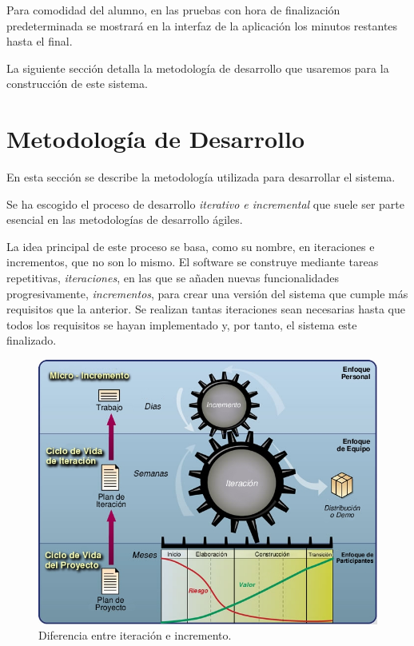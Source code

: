 Para comodidad del alumno, en las pruebas con hora de finalización predeterminada se mostrará en la interfaz de la aplicación los minutos restantes hasta el final.
\newline


La siguiente sección detalla la metodología de desarrollo que usaremos para la construcción de este sistema.

\section{Metodología de Desarrollo}
\label{sec:planificacion:metodologia}

En esta sección se describe la metodología utilizada para desarrollar el sistema.
\newline

Se ha escogido el proceso de desarrollo \emph{iterativo e incremental} que suele ser parte esencial en las metodologías de desarrollo ágiles.
\newline

La idea principal de este proceso se basa, como su nombre, en iteraciones e incrementos, que no son lo mismo.
El software se construye mediante tareas repetitivas, \emph{iteraciones}, en las que se añaden nuevas funcionalidades progresivamente, \emph{incrementos}, para crear una versión del sistema que cumple más requisitos que la anterior. Se realizan tantas iteraciones sean necesarias hasta que todos los requisitos se hayan implementado y, por tanto, el sistema este finalizado.
\newline


\begin{figure}
    \centering
    \includegraphics[width=\linewidth]{planificacion/iteracionIncremento}
    \caption{Diferencia entre iteración e incremento.}
    \label{fig:planificacion:iteracionIncremento}
\end{figure}

